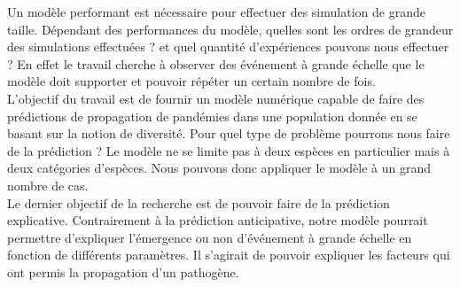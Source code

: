 Un modèle performant est nécessaire pour effectuer des simulation de grande taille. Dépendant des performances du modèle, quelles sont les ordres de grandeur des simulations effectuées ? et quel quantité d'expériences pouvons nous effectuer ? En effet le travail cherche à observer des événement à grande échelle que le modèle doit supporter et pouvoir répéter un certain nombre de fois.\\

L'objectif du travail est de fournir un modèle numérique capable de faire des prédictions de propagation de pandémies dans une population donnée en se basant sur la notion de diversité. Pour quel type de problème pourrons nous faire de la prédiction ? Le modèle ne se limite pas à deux espèces en particulier mais à deux catégories d'espèces. Nous pouvons donc appliquer le modèle à un grand nombre de cas.\\

Le dernier objectif de la recherche est de pouvoir faire de la prédiction explicative. Contrairement à la prédiction anticipative, notre modèle pourrait permettre d'expliquer l'émergence ou non d'événement à grande échelle en fonction de différents paramètres. Il s'agirait de pouvoir expliquer les facteurs qui ont permis la propagation d'un pathogène.